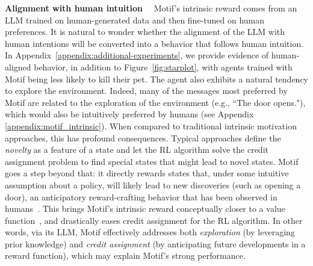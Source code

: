 \documentclass{article} %
\begin{document}
\textbf{Alignment with human intuition}~~
Motif's intrinsic reward comes from an LLM trained on human-generated data and then fine-tuned on human preferences.
It is natural to wonder whether the alignment of the LLM with human intentions will be converted into a behavior that follows human intuition.
In Appendix~\ref{appendix:additional-experiments}, we provide evidence of human-aligned behavior, in addition to Figure~\ref{fig:starplot}, with agents trained with Motif being less likely to kill their pet.
The agent also exhibits a natural tendency to explore the environment.
Indeed, many of the messages most preferred by Motif are related to the exploration of the environment (e.g., ``The door opens."), which would also be intuitively preferred by humans (see Appendix \ref{appendix:motif_intrinsic}).
When compared to traditional intrinsic motivation approaches, this has profound consequences.
Typical approaches define the \emph{novelty} as a feature of a state and let the RL algorithm solve the credit assignment problem to find special states that might lead to novel states.
Motif goes a step beyond that: it directly rewards states that, under some intuitive assumption about a policy, will likely lead to new discoveries (such as opening a door), an anticipatory reward-crafting behavior that has been observed in humans~\citep{thomaz2006reinforcement}.
This brings Motif's intrinsic reward conceptually closer to a value function~\citep{ng1999policy}, and drastically eases credit assignment for the RL algorithm.
In other words, via its LLM, Motif effectively addresses both \emph{exploration} (by leveraging prior knowledge) and \emph{credit assignment} (by anticipating future developments in a reward function), which may explain Motif's strong performance.
\end{document}
